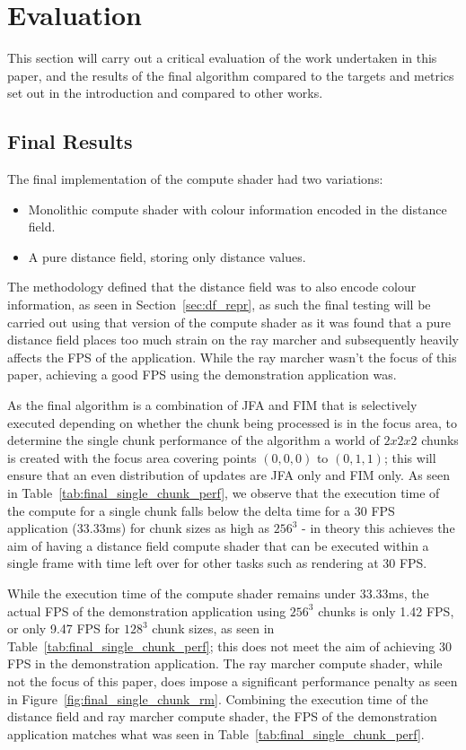 \chapter{Evaluation}
This section will carry out a critical evaluation of the work undertaken in this paper, and the results of the final
algorithm compared to the targets and metrics set out in the introduction and compared to other works.

\section{Final Results}
The final implementation of the compute shader had two variations:

\begin{itemize}
    \item Monolithic compute shader with colour information encoded in the distance field.
    \item A pure distance field, storing only distance values.
\end{itemize}

The methodology defined that the distance field was to also encode colour information, as seen in
Section~\ref{sec:df_repr}, as such the final testing will be carried out using that version of the compute shader as it
was found that a pure distance field places too much strain on the ray marcher and subsequently heavily affects the FPS
of the application. While the ray marcher wasn't the focus of this paper, achieving a good FPS using the demonstration
application was.

As the final algorithm is a combination of JFA and FIM that is selectively executed depending on whether the chunk being
processed is in the focus area, to determine the single chunk performance of the algorithm a world of $2x2x2$ chunks is
created with the focus area covering points $(0, 0, 0)$ to $(0, 1, 1)$; this will ensure that an even distribution of
updates are JFA only and FIM only. As seen in Table~\ref{tab:final_single_chunk_perf}, we observe that the execution
time of the compute for a single chunk falls below the delta time for a 30 FPS application (33.33ms) for chunk sizes
as high as $256^3$ - in theory this achieves the aim of having a distance field compute shader that can be executed
within a single frame with time left over for other tasks such as rendering at 30 FPS.

While the execution time of the compute shader remains under 33.33ms, the actual FPS of the demonstration application
using $256^3$ chunks is only 1.42 FPS, or only 9.47 FPS for $128^3$ chunk sizes, as seen in
Table~\ref{tab:final_single_chunk_perf}; this does not meet the aim of achieving 30 FPS in the demonstration
application. The ray marcher compute shader, while not the focus of this paper, does impose a significant performance
penalty as seen in Figure~\ref{fig:final_single_chunk_rm}. Combining the execution time of the distance field and ray
marcher compute shader, the FPS of the demonstration application matches what was seen in
Table~\ref{tab:final_single_chunk_perf}.

